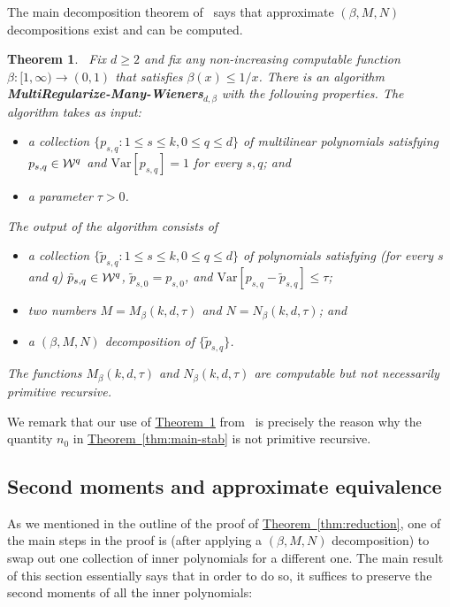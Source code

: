 \documentclass[11pt]{article}
\numberwithin{equation}{section}
\newtheorem{theorem}{Theorem}[section]
\theoremstyle{definition}
\theoremstyle{plain}
\newcommand{\expref}[2]{\hyperref[#2]{#1~\ref{#2}}}
\newcommand{\Var}{\mathrm{Var}}
\begin{document}
The main decomposition theorem of~\cite{DS14} says that approximate $(\beta, M, N)$
decompositions exist and can be computed.

\begin{theorem}~\label{thm:decomp} 
Fix $d \geq 2$ and fix any non-increasing computable
function $\beta:  [1,\infty) \to (0,1)$ that satisfies $\beta(x) \leq 1/x$.
There is an algorithm {\bf MultiRegularize-Many-Wieners}$_{d,\beta}$
with the following properties.
The algorithm takes as input:
\begin{itemize}
    \item a collection $\{p_{s,q}: 1 \le s \le k, 0 \le q \le d\}$ of multilinear polynomials
        satisfying $p_{s,q} \in {\cal W}^q$ and $\Var[p_{s,q}] = 1$ for every $s, q$; and
    \item a parameter $\tau > 0$.
\end{itemize}
The output of the algorithm consists of
\begin{itemize}
    \item a collection $\{\tilde p_{s,q}: 1 \le s \le k, 0 \le q \le d\}$
        of polynomials
        satisfying (for every $s$ and $q$) $\tilde p_{s,q} \in {\cal W}^q$,
    $\tilde p_{s,0} = p_{s,0}$, and $\Var[p_{s,q} - \tilde p_{s,q}] \le \tau$;
    \item two numbers $M = M_\beta(k, d, \tau)$ and $N = N_\beta(k, d, \tau)$; and
    \item a $(\beta, M, N)$ decomposition of $\{\tilde p_{s,q}\}$.
\end{itemize}
The functions $M_{\beta}(k,d,\tau)$ and $N_{\beta}(k,d,\tau)$ are computable but not necessarily primitive recursive.
\end{theorem}

We remark that our use of \expref{Theorem}{thm:decomp} from~\cite{DS14} is precisely the reason why the quantity $n_0$ in
\expref{Theorem}{thm:main-stab} is not primitive recursive. 

\subsection{Second moments and approximate equivalence}

As we mentioned in the outline of the proof of \expref{Theorem}{thm:reduction}, one
of the main steps in the proof is (after applying a $(\beta, M, N)$
decomposition) to swap out one collection of inner polynomials for a different
one. The main result of this section essentially says that in order to do so,
it suffices to preserve the second moments of all the inner polynomials:
\end{document}
